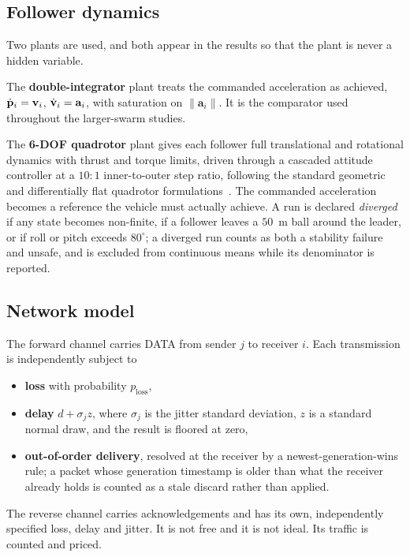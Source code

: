 \subsection{Follower dynamics}

Two plants are used, and both appear in the results so that the plant is
never a hidden variable.

The \textbf{double-integrator} plant treats the commanded acceleration as
achieved, $\dot{\mathbf{p}}_i = \mathbf{v}_i$, $\dot{\mathbf{v}}_i = \mathbf{a}_i$, with
saturation on $\|\mathbf{a}_i\|$. It is the comparator used throughout the
larger-swarm studies.

The \textbf{6-DOF quadrotor} plant gives each follower full translational
and rotational dynamics with thrust and torque limits, driven through a
cascaded attitude controller at a $10{:}1$ inner-to-outer step ratio,
following the standard geometric and differentially flat quadrotor
formulations~\cite{lee2010geometric,mellinger2011minimum}. The
commanded acceleration becomes a reference the vehicle must actually
achieve. A run is declared \emph{diverged} if any state becomes
non-finite, if a follower leaves a $50$~m ball around the leader, or if
roll or pitch exceeds $80^\circ$; a diverged run counts as both a
stability failure and unsafe, and is excluded from continuous means while
its denominator is reported.

\subsection{Network model}

The forward channel carries DATA from sender $j$ to receiver $i$. Each
transmission is independently subject to
\begin{itemize}
\item \textbf{loss} with probability $p_{\mathrm{loss}}$,
\item \textbf{delay} $d + \sigma_j z$, where $\sigma_j$ is the jitter
      standard deviation, $z$ is a standard normal draw, and the result is
      floored at zero,
\item \textbf{out-of-order delivery}, resolved at the receiver by a
      newest-generation-wins rule; a packet whose generation timestamp is
      older than what the receiver already holds is counted as a stale
      discard rather than applied.
\end{itemize}

The reverse channel carries acknowledgements and has its own,
independently specified loss, delay and jitter. It is not free and it is
not ideal. Its traffic is counted and priced.


